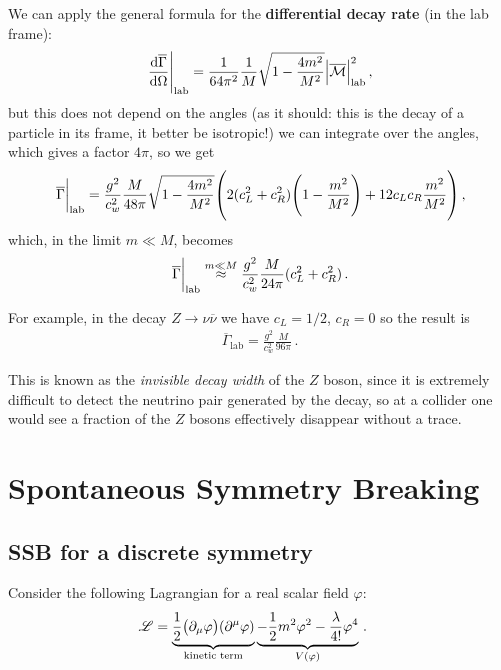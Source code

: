 \documentclass[main.tex]{subfiles}
\begin{document}
We can apply the general formula for the \textbf{differential decay rate} (in the lab frame): 
%
\begin{align}
\eval{\dv{\overline{\Gamma} }{\Omega }}_{\text{lab}}
= \frac{1}{64 \pi^2} \frac{1}{M} 
\sqrt{1- \frac{4m^2}{M^2}} \abs{\mathcal{\overline{M}}}^2_{\text{lab}}
\,,
\end{align}
%
but this does not depend on the angles (as it should: this is the decay of a particle in its frame, it better be isotropic!) we can integrate over the angles, which gives a factor \(4 \pi \), so we get 
%
\begin{align}
\eval{\overline{\Gamma}}_{\text{lab}}=
\frac{g^2}{c_w^2}
\frac{M}{48 \pi } \sqrt{1 - \frac{4m^2}{M^2}}
\qty(2 (c_L^2 + c_R^2) \qty(1 - \frac{m^2}{M^2}) + 12 c_L c_R \frac{m^2}{M^2})
\,,
\end{align}
%
which, in the limit \(m \ll M\), becomes  
%
\begin{align}
\eval{\overline{\Gamma}}_{\text{lab}}
\overset{m \ll M}{\approx}
\frac{g^2}{c_w^2}
\frac{M}{24 \pi }
(c_L^2 + c_R^2)
\,.
\end{align}

For example, in the decay \(Z \to \nu \overline{\nu}\) we have \(c_L = 1/2\), \(c_R = 0\) so the result is 
%
\begin{align}
\overline{\Gamma}_{\text{lab}}
= \frac{g^2}{c_w^2} \frac{M}{96 \pi }
\,.
\end{align}

This is known as the \emph{invisible decay width} of the \(Z\) boson, since it is extremely difficult to detect the neutrino pair generated by the decay, so at a collider one would see a fraction of the \(Z\) bosons effectively disappear without a trace.

\section{Spontaneous Symmetry Breaking} \label{sec:ssb}

\subsection{SSB for a discrete symmetry}

Consider the following Lagrangian for a real scalar field \(\varphi \): 
%
\begin{align}
\mathscr{L} &= \underbrace{\frac{1}{2} \qty( \partial_{\mu } \varphi ) \qty(\partial^{\mu } \varphi )}_{\text{kinetic term}}
\underbrace{- \frac{1}{2} m^2 \varphi^2 - \frac{\lambda}{4!} \varphi^{4} }_{V(\varphi )}
\,.
\end{align}
\end{document}
